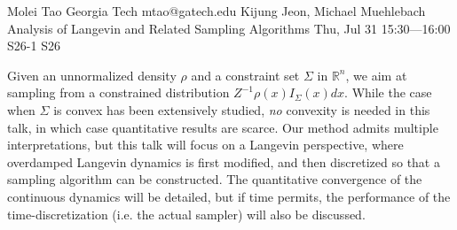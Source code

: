 \begin{talk}
  {Molei Tao}%
  {Georgia Tech}%
  {mtao@gatech.edu}%
  {Kijung Jeon, Michael Muehlebach}%
  {Analysis of Langevin and Related Sampling Algorithms}%
  {}%
  {Thu, Jul 31 15:30---16:00}%
  {S26-1}%
  {S26}%
    

Given an unnormalized density $\rho$ and a constraint set $\Sigma$ in $\mathbb{R}^n$, we aim at sampling from a constrained distribution $Z^{-1} \rho(x) I_{\Sigma}(x) dx$. While the case when $\Sigma$ is convex has been extensively studied, \emph{no} convexity is needed in this talk, in which case quantitative results are scarce. %
Our method admits multiple interpretations, but this talk will focus on a Langevin perspective, where overdamped Langevin dynamics is first modified, and then discretized so that a sampling algorithm can be constructed. The quantitative convergence of the continuous dynamics will be detailed, but if time permits, the performance of the time-discretization (i.e. the actual sampler) will also be discussed.





\end{talk}
